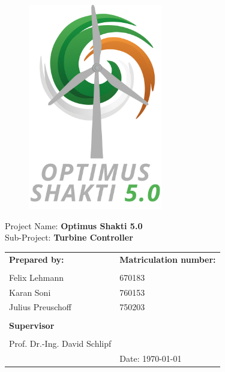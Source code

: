{	\vspace{3cm}
	\begin{figure}[tbh]
		\centering
		\includegraphics[height=9cm]{Figures/logos/Shakti}
	\end{figure}
	
	\begin{minipage}[b][0cm][t]{\textwidth}
		\fontsize{20pt}{20pt}
		\selectfont
		Project Name: \textbf{Optimus Shakti 5.0}\\
		Sub-Project: \textbf{Turbine Controller}
	\end{minipage}
	\begin{minipage}[b][0cm][t]{\textwidth}
		\vspace{1.5cm}
		\fontsize{12pt}{14pt}
		\selectfont
		\begin{tabular}{l b{8cm}}
			\textbf{Prepared by:} & \textbf{Matriculation number:}\\
			\\
			Felix Lehmann & 670183 \\
			Karan Soni & 760153\\
			Julius Preuschoff & 750203 \\
			\\
			\textbf{Supervisor} & \\
			\\
			Prof. Dr.-Ing. David Schlipf & \\
			& Date: \today\\
		\end{tabular}
	\end{minipage}
}
